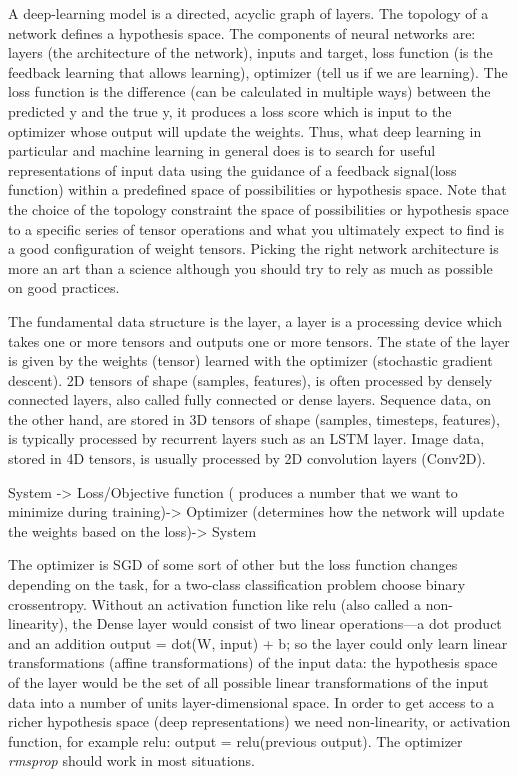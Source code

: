 \documentclass[12pt]{report}
\begin{document}
A deep-learning model is a directed, acyclic graph of layers. The topology of a network defines a hypothesis space.
The components of neural networks are: layers (the architecture of the network), inputs and target, loss function (is the feedback learning that allows learning), optimizer (tell us if we are learning). The loss function is the difference (can be calculated in multiple ways) between the predicted y and the true y, it produces a loss score which is input to the optimizer whose output will update the weights. 
Thus, what deep learning in particular and machine learning in general does is to search for useful representations of input data using the guidance of a feedback signal(loss function) within a predefined space of possibilities or hypothesis space. Note that the choice of the topology constraint the space of possibilities or hypothesis space to a specific series of tensor operations and what you ultimately expect to find is a good configuration of weight tensors. Picking the right network architecture is more an art than a science although you should try to rely as much as possible on good practices.

The fundamental data structure is the layer, a layer is a processing device which takes one or more tensors and outputs one or more tensors. The state of the layer is given by the weights (tensor) learned with the optimizer (stochastic gradient descent).
2D tensors of shape (samples, features), is often processed by densely connected layers, also called fully connected or dense layers. Sequence data, on the other hand, are stored in 3D tensors of shape (samples, timesteps, features), is typically processed by recurrent layers such as an LSTM layer. Image data, stored in 4D tensors, is usually processed by 2D convolution layers (Conv2D).


System -> Loss/Objective function ( produces a number that we want to minimize during training)-> Optimizer (determines how the network will update the weights based on the loss)-> System 

The optimizer is SGD of some sort of other but the loss function changes depending on the task, for a two-class classification problem choose binary crossentropy. Without an activation function like relu (also called a non-linearity), the Dense layer would consist of two linear operations—a dot product and an addition output = dot(W, input) + b; so the layer could only learn linear transformations (affine transformations) of the input data: the hypothesis space of the layer would be the set of all possible linear transformations of the input data into a number of units layer-dimensional space. 
In order to get access to a richer hypothesis space (deep representations) we need non-linearity, or activation function, for example relu: output = relu(previous output). The optimizer \textit{rmsprop} should work in most situations.
\end{document}
